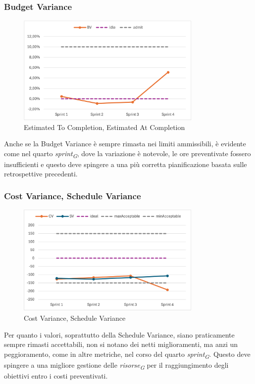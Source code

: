 \subsubsection{Budget Variance}
\begin{figure}[H]
    \centering
    \includegraphics[width=0.8\textwidth]{./images/BV.png}
    \caption{Estimated To Completion, Estimated At Completion}
\end{figure}
Anche se la Budget Variance è sempre rimasta nei limiti ammissibili, è evidente come nel quarto \textit{sprint\textsubscript{G}}, dove la variazione è notevole, le ore preventivate fossero insufficienti e questo deve spingere a una più corretta pianificazione basata sulle retrospettive precedenti.

\subsubsection{Cost Variance, Schedule Variance}
\begin{figure}[H]
    \centering
    \includegraphics[width=0.8\textwidth]{./images/CV-SV.png}
    \caption{Cost Variance, Schedule Variance}
\end{figure}
Per quanto i valori, soprattutto della Schedule Variance, siano praticamente sempre rimasti accettabili, non si notano dei netti miglioramenti, ma anzi un peggioramento, come in altre metriche, nel corso del quarto \textit{sprint\textsubscript{G}}. Questo deve spingere a una migliore gestione delle \textit{risorse\textsubscript{G}} per il raggiungimento degli obiettivi entro i costi preventivati.

